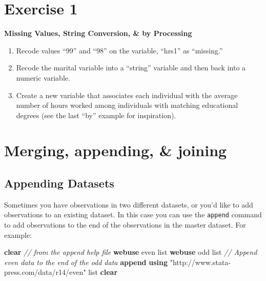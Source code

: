 \documentclass[]{book}
\newenvironment{Shaded}{\begin{snugshade}}{\end{snugshade}}
\newcommand{\CommentTok}[1]{\textcolor[rgb]{0.56,0.35,0.01}{\textit{#1}}}
\newcommand{\KeywordTok}[1]{\textcolor[rgb]{0.13,0.29,0.53}{\textbf{#1}}}
\newcommand{\NormalTok}[1]{#1}
\newcommand{\OtherTok}[1]{\textcolor[rgb]{0.56,0.35,0.01}{#1}}
\newcommand{\StringTok}[1]{\textcolor[rgb]{0.31,0.60,0.02}{#1}}
\providecommand{\tightlist}{%
  \setlength{\itemsep}{0pt}\setlength{\parskip}{0pt}}
\begin{document}
\hypertarget{exercise-1-7}{%
\section{Exercise 1}\label{exercise-1-7}}

\textbf{Missing Values, String Conversion, \& by Processing}

\begin{enumerate}
\def\labelenumi{\arabic{enumi}.}
\tightlist
\item
  Recode values ``99'' and ``98'' on the variable, ``hrs1'' as ``missing.''
\item
  Recode the marital variable into a ``string'' variable and then back into a numeric variable.
\item
  Create a new variable that associates each individual with the average number of hours worked among individuals with matching educational degrees (see the last ``by'' example for inspiration).
\end{enumerate}

\hypertarget{merging-appending-joining}{%
\section{Merging, appending, \& joining}\label{merging-appending-joining}}

\hypertarget{appending-datasets}{%
\subsection{Appending Datasets}\label{appending-datasets}}

Sometimes you have observations in two different datasets, or you'd like to add observations to an existing dataset. In this case you can use the \texttt{append} command to add observations to the end of the observations in the master dataset. For example:

\begin{Shaded}
\begin{Highlighting}[]
  \KeywordTok{clear}
  \CommentTok{// from the append help file}
  \KeywordTok{webuse}\NormalTok{ even}
  \OtherTok{list}
  \KeywordTok{webuse}\NormalTok{ odd}
  \OtherTok{list}
  \CommentTok{// Append even data to the end of the odd data}
  \KeywordTok{append} \KeywordTok{using} \StringTok{"http://www.stata-press.com/data/r14/even"}
  \OtherTok{list}
  \KeywordTok{clear}
\end{Highlighting}
\end{Shaded}
\end{document}
